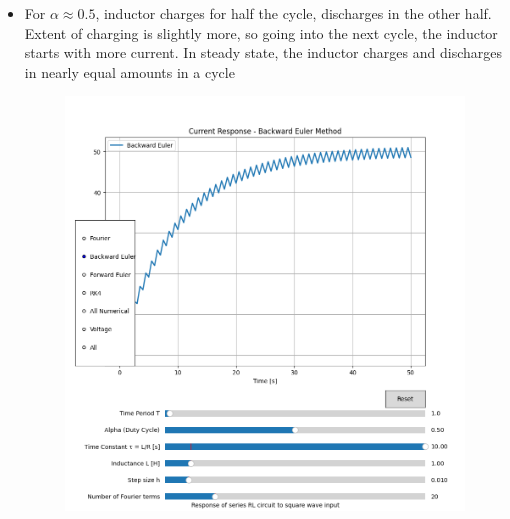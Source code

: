 \documentclass[12pt,a4paper]{report}
\begin{document}
\begin{itemize}
\begin{itemize}
\begin{figure}[h!]
        \end{figure}
        \item For $\alpha \approx 0.5$, inductor charges for half the cycle, discharges in the other half. Extent of charging is slightly more, so going into the next cycle, the inductor starts with more current. In steady state, the inductor charges and discharges in nearly equal amounts in a cycle
        \pagebreak
        \begin{figure}[h!]
	\centering
	\includegraphics[scale=0.6]{figs/tau>>T-2.png}
        \end{figure}
    

\end{itemize}
\end{itemize}
\end{document}

